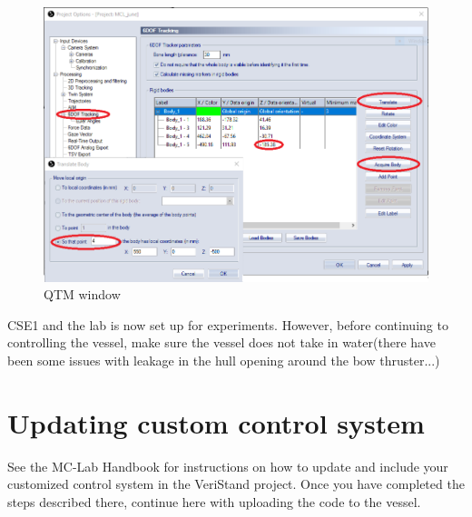 \begin{figure}[htb!]
	\centering
	\includegraphics[scale=0.5]{fig/QTM_window.png}
	\caption{QTM window}
	\label{fig:QTM_window}
\end{figure}
CSE1 and the lab is now set up for experiments. However, before continuing to controlling the vessel, make sure the vessel does not take in water(there have been some issues with leakage in the hull opening around the bow thruster...)
\section{Updating custom control system}
See the MC-Lab Handbook for instructions on how to update and include your customized control system in the VeriStand project. Once you have completed the steps described there, continue here with uploading the code to the vessel. 
